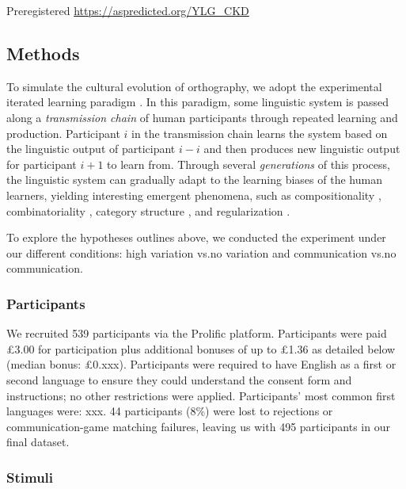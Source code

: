 \documentclass[doc,biblatex]{apa7}
\begin{document}
Preregistered \url{https://aspredicted.org/YLG_CKD}

\subsection{Methods}

To simulate the cultural evolution of orthography, we adopt the experimental iterated learning paradigm \parencite{Kirby:2008, Kirby:2015}. In this paradigm, some linguistic system is passed along a \textit{transmission chain} of human participants through repeated learning and production. Participant $i$ in the transmission chain learns the system based on the linguistic output of participant $i-i$ and then produces new linguistic output for participant $i+1$ to learn from. Through several \textit{generations} of this process, the linguistic system can gradually adapt to the learning biases of the human learners, yielding interesting emergent phenomena, such as compositionality \parencite{Kirby:2008, Kirby:2015}, combinatoriality \parencite{Verhoef:2015}, category structure \parencite{Carr:2017, Carr:2020}, and regularization \parencite{Smith:2010, Ferdinand:2019}.

To explore the hypotheses outlines above, we conducted the experiment under our different conditions: high variation vs.\@ no variation and communication vs.\@ no communication.

\subsubsection{Participants}

We recruited 539 participants via the Prolific platform. Participants were paid £3.00 for participation plus additional bonuses of up to £1.36 as detailed below (median bonus: £0.xxx). Participants were required to have English as a first or second language to ensure they could understand the consent form and instructions; no other restrictions were applied. Participants' most common first languages were: xxx. 44 participants (8\%) were lost to rejections or communication-game matching failures, leaving us with 495 participants in our final dataset.

\subsubsection{Stimuli}
\end{document}
